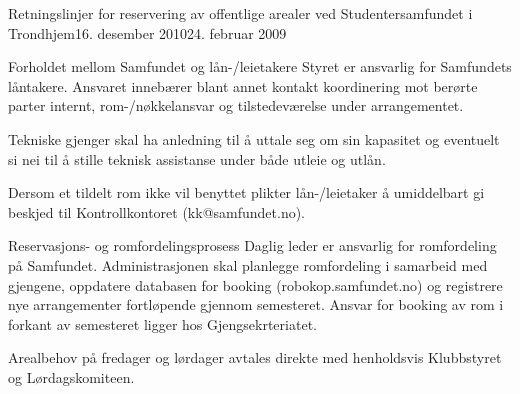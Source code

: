 \begin{instruks}{Retningslinjer for reservering av offentlige arealer
    ved Studentersamfundet i Trondhjem}{16. desember 2010}{24. februar 2009}
\begin{instruksledd}{Forholdet mellom Samfundet og lån-/leietakere}
        Styret er ansvarlig for Samfundets låntakere. Ansvaret innebærer blant annet
        kontakt koordinering mot berørte parter
        internt, rom-/nøkkelansvar og tilstedeværelse under arrangementet.

        Tekniske gjenger skal ha anledning til å uttale seg om sin kapasitet og
        eventuelt si nei til å stille teknisk assistanse
        under både utleie og utlån.

        Dersom et tildelt rom ikke vil benyttet plikter lån-/leietaker å umiddelbart
        gi beskjed til Kontrollkontoret (kk@samfundet.no).
    \end{instruksledd}

    \begin{instruksledd}{Reservasjons- og romfordelingsprosess}
        Daglig leder er ansvarlig for romfordeling på Samfundet. Administrasjonen skal
        planlegge romfordeling i samarbeid
        med gjengene, oppdatere databasen for booking (robokop.samfundet.no) og
        registrere nye arrangementer fortløpende
        gjennom semesteret. Ansvar for booking av rom i forkant av semesteret ligger
        hos Gjengsekrteriatet.


        Arealbehov på fredager og lørdager avtales direkte med henholdsvis Klubbstyret
        og Lørdagskomiteen.


\end{instruksledd}
\end{instruks}
